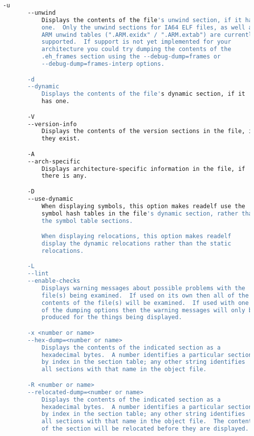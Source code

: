{{\begin{lstlisting}[language=bash]
       -u
       --unwind
           Displays the contents of the file's unwind section, if it has
           one.  Only the unwind sections for IA64 ELF files, as well as
           ARM unwind tables (".ARM.exidx" / ".ARM.extab") are currently
           supported.  If support is not yet implemented for your
           architecture you could try dumping the contents of the
           .eh_frames section using the --debug-dump=frames or
           --debug-dump=frames-interp options.

       -d
       --dynamic
           Displays the contents of the file's dynamic section, if it
           has one.

       -V
       --version-info
           Displays the contents of the version sections in the file, it
           they exist.

       -A
       --arch-specific
           Displays architecture-specific information in the file, if
           there is any.

       -D
       --use-dynamic
           When displaying symbols, this option makes readelf use the
           symbol hash tables in the file's dynamic section, rather than
           the symbol table sections.

           When displaying relocations, this option makes readelf
           display the dynamic relocations rather than the static
           relocations.

       -L
       --lint
       --enable-checks
           Displays warning messages about possible problems with the
           file(s) being examined.  If used on its own then all of the
           contents of the file(s) will be examined.  If used with one
           of the dumping options then the warning messages will only be
           produced for the things being displayed.

       -x <number or name>
       --hex-dump=<number or name>
           Displays the contents of the indicated section as a
           hexadecimal bytes.  A number identifies a particular section
           by index in the section table; any other string identifies
           all sections with that name in the object file.

       -R <number or name>
       --relocated-dump=<number or name>
           Displays the contents of the indicated section as a
           hexadecimal bytes.  A number identifies a particular section
           by index in the section table; any other string identifies
           all sections with that name in the object file.  The contents
           of the section will be relocated before they are displayed.


\end{lstlisting}}}
